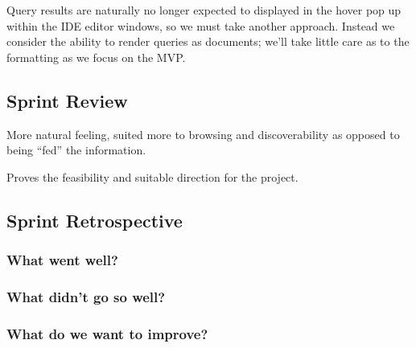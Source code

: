 Query results are naturally no longer expected to displayed in the hover pop up within the IDE editor windows, so we must take another approach. Instead we consider the ability to render queries as documents; we'll take little care as to the formatting as we focus on the MVP.


\subsection{Sprint Review}

More natural feeling, suited more to browsing and discoverability as opposed to being ``fed'' the information.

Proves the feasibility and suitable direction for the project.

\subsection{Sprint Retrospective}

\subsubsection{What went well?}

\subsubsection{What didn't go so well?}

\subsubsection{What do we want to improve?}